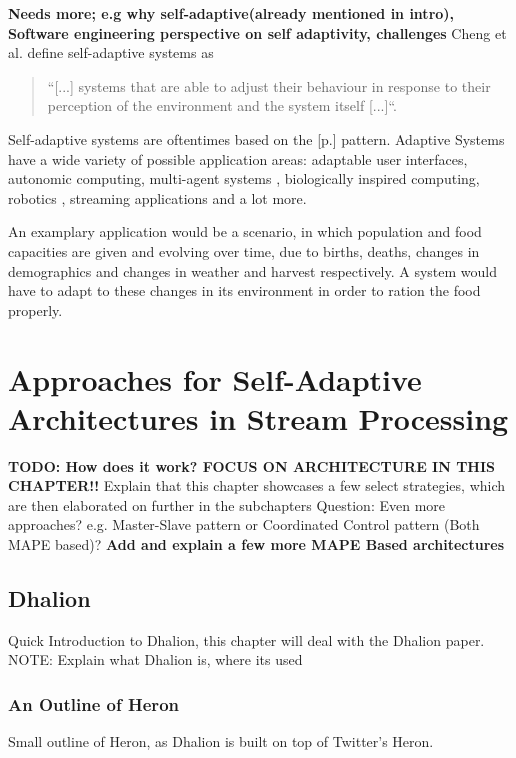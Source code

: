     

    \textbf{Needs more; e.g why self-adaptive(already mentioned in intro), Software engineering perspective on self adaptivity, challenges}
    Cheng et al. define self-adaptive systems as
    \begin{quotation}
        ``[...] systems that are able to adjust their behaviour in response to their perception of the environment and the
        system itself [...]``\cite[p.1]{Cheng:2009:SES:1573856.1573858}.
    \end{quotation}
    
    Self-adaptive systems are oftentimes based on the  [p.\pageref{sec:mape}] pattern.
    Adaptive Systems have a wide variety of possible application areas: adaptable user interfaces, autonomic computing, multi-agent systems \cite{Cheng:2009:SES:1573856.1573858}, 
    biologically inspired computing, robotics \cite{10.1007/978-3-319-59480-4_44}, streaming applications and a lot more.

    An examplary application would be a scenario, in which population and food capacities are given and evolving over time, due to births, deaths, changes in demographics 
    and changes in weather and harvest respectively. A system would have to adapt to these changes in its environment in order to ration the food properly.


\chapter{Approaches for Self-Adaptive Architectures in Stream Processing}
\label{cha:approaches}
\textbf{TODO: How does it work? FOCUS ON ARCHITECTURE IN THIS CHAPTER!!}
Explain that this chapter showcases a few select strategies, which are then elaborated on further in the subchapters
Question: Even more approaches? e.g. Master-Slave pattern or Coordinated Control pattern (Both MAPE based)?
\textbf{Add and explain a few more MAPE Based architectures}

    \section{Dhalion}
    \label{sec:dhalion}
    Quick Introduction to Dhalion, this chapter will deal with the Dhalion paper.
    NOTE: Explain what Dhalion is, where its used

        \subsection{An Outline of Heron}
        \label{sub:heron-outline}
        Small outline of Heron, as Dhalion is built on top of Twitter's Heron.

